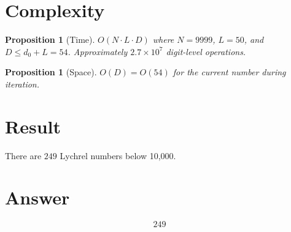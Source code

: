 \documentclass[12pt]{article}
\newtheorem{proposition}[theorem]{Proposition}
\theoremstyle{definition}
\theoremstyle{remark}
\begin{document}
\section{Complexity}

\begin{proposition}[Time]
$O(N \cdot L \cdot D)$ where $N = 9999$, $L = 50$, and $D \leq d_0 + L = 54$. Approximately $2.7 \times 10^7$ digit-level operations.
\end{proposition}

\begin{proposition}[Space]
$O(D) = O(54)$ for the current number during iteration.
\end{proposition}

\section{Result}
There are $\boxed{249}$ Lychrel numbers below 10{,}000.

\section{Answer}

\[
\boxed{249}
\]
\end{document}
